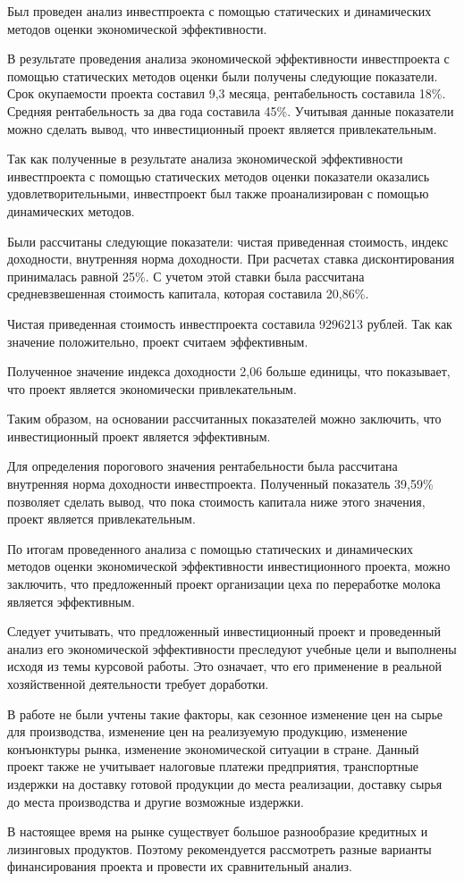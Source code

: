 Был проведен анализ инвестпроекта с помощью статических и динамических методов оценки экономической эффективности.

В результате проведения анализа экономической эффективности инвестпроекта с помощью статических методов оценки были получены следующие показатели. Срок окупаемости проекта составил 9,3 месяца, рентабельность составила 18\%. Средняя рентабельность за два года составила 45\%. Учитывая данные показатели можно сделать вывод, что инвестиционный проект является привлекательным.

Так как полученные в результате анализа экономической эффективности инвестпроекта с помощью статических методов оценки показатели оказались удовлетворительными, инвестпроект был также проанализирован с помощью динамических методов.

Были рассчитаны следующие показатели: чистая приведенная стоимость, индекс доходности, внутренняя норма доходности. При расчетах ставка дисконтирования принималась равной 25\%. С учетом этой ставки была рассчитана средневзвешенная стоимость капитала, которая составила 20,86\%.

Чистая приведенная стоимость инвестпроекта составила 9296213 рублей. Так как значение положительно, проект считаем эффективным.

Полученное значение индекса доходности 2,06 больше единицы, что показывает, что проект является экономически привлекательным.

Таким образом, на основании рассчитанных показателей можно заключить, что инвестиционный проект является эффективным.

Для определения порогового значения рентабельности была рассчитана внутренняя норма доходности инвестпроекта. Полученный показатель 39,59\% позволяет сделать вывод, что пока стоимость капитала ниже этого значения, проект является привлекательным.

По итогам проведенного анализа с помощью статических и динамических методов оценки экономической эффективности инвестиционного проекта, можно заключить, что предложенный проект организации цеха по переработке молока является эффективным.

Следует учитывать, что предложенный инвестиционный проект и проведенный анализ его экономической эффективности преследуют учебные цели и выполнены исходя из темы курсовой работы. Это означает, что его применение в реальной хозяйственной деятельности требует доработки.

В работе не были учтены такие факторы, как сезонное изменение цен на сырье для производства, изменение цен на реализуемую продукцию, изменение конъюнктуры рынка, изменение экономической ситуации в стране. Данный проект также не учитывает налоговые платежи предприятия, транспортные издержки на доставку готовой продукции до места реализации, доставку сырья до места производства и другие возможные издержки.

В настоящее время на рынке существует большое разнообразие кредитных и лизинговых продуктов. Поэтому рекомендуется рассмотреть разные варианты финансирования проекта и провести их сравнительный анализ.


















